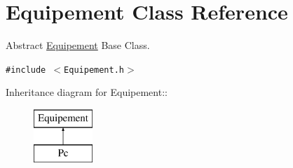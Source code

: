 \hypertarget{class_equipement}{
\section{Equipement Class Reference}
\label{class_equipement}
}
Abstract \hyperlink{class_equipement}{Equipement} Base Class.  


{\tt \#include $<$Equipement.h$>$}

Inheritance diagram for Equipement::\begin{figure}[H]
\begin{center}
\leavevmode
\includegraphics[height=2cm]{class_equipement}
\end{center}
\end{figure}
